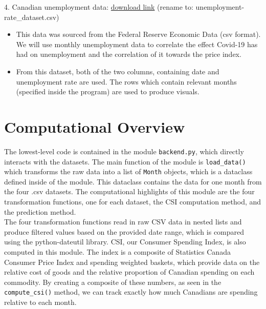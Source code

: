 \documentclass[fontsize=11pt]{article}
\newcommand{\blue}[1]{\textcolor{blue}{#1}}
\begin{document}
4. Canadian unemployment data: \blue{\href{https://fred.stlouisfed.org/graph/fredgraph.csv?bgcolor=\%23e1e9f0&chart_type=line&drp=0&fo=open\%20sans&graph_bgcolor=\%23ffffff&height=450&mode=fred&recession_bars=off&txtcolor=\%23444444&ts=12&tts=12&width=1168&nt=0&thu=0&trc=0&show_legend=yes&show_axis_titles=yes&show_tooltip=yes&id=LRUNTTTTCAM156S&scale=left&cosd=1960-01-01&coed=2021-10-01&line_color=\%234572a7&link_values=false&line_style=solid&mark_type=none&mw=3&lw=2&ost=-99999&oet=99999&mma=0&fml=a&fq=Monthly&fam=avg&fgst=lin&fgsnd=2020-02-01&line_index=1&transformation=lin&vintage_date=2021-12-05&revision_date=2021-12-05&nd=1960-01-01}{download link}} (rename to: unemployment-rate\_dataset.csv)
\begin{itemize}
\item This data was sourced from the Federal Reserve Economic Data (csv format). We will use monthly unemployment data to correlate the effect Covid-19 has had on unemployment and the correlation of it towards the price index.
\item From this dataset, both of the two columns, containing date and unemployment rate are used. The rows which contain relevant months (specified inside the program) are used to produce visuals.
\end{itemize}

\section*{Computational Overview}
\tab The lowest-level code is contained in the module \texttt{backend.py}, which directly interacts with the datasets. The main function of the module is \texttt{load\_data()} which transforms the raw data into a list of \texttt{Month} objects, which is a dataclass defined inside of the module. This dataclass contains the data for one month from the four .csv datasets. The computational highlights of this module are the four transformation functions, one for each dataset, the CSI computation method, and the prediction method.\\

\tab The four transformation functions read in raw CSV data in nested lists and produce filtered values based on the provided date range, which is compared using the python-dateutil library. CSI, our Consumer Spending Index, is also computed in this module. The index is a composite of Statistics Canada Consumer Price Index and spending weighted baskets, which provide data on the relative cost of goods and the relative proportion of Canadian spending on each commodity. By creating a composite of these numbers, as seen in the \texttt{compute\_csi()} method, we can track exactly how much Canadians are spending relative to each month.\\
\end{document}
